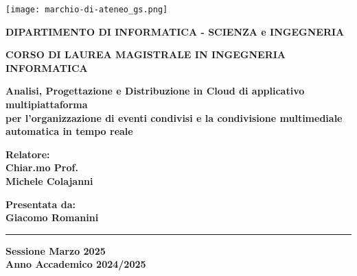 
\begin{titlepage}
    
\pagestyle{empty}


\begin{center}

\texttt{[image: marchio-di-ateneo\_gs.png]}

\vspace{10mm}

{\normalsize{\bf{DIPARTIMENTO DI INFORMATICA - SCIENZA e INGEGNERIA}}} 

\vspace{5mm}

{\large{\bf{CORSO DI LAUREA MAGISTRALE IN INGEGNERIA INFORMATICA}}}
\end{center}
\vspace{23mm}
\begin{adjustwidth}{15mm}{15mm}
\begin{center}

{\LARGE{\bf Analisi, Progettazione e Distribuzione in Cloud di applicativo multipiattaforma}}\\

{\LARGE{\bf per l'organizzazione di eventi condivisi e la condivisione multimediale automatica in tempo reale}}\\
\vspace{3mm}
\vspace{3mm}

\end{center}
\end{adjustwidth}

\vspace{35mm}

\begin{minipage}[t]{0.40\textwidth}
{\Large{\bf Relatore: \\ Chiar.mo Prof.\\ Michele Colajanni}}

\vspace{3mm}

{\Large{\bf }}
\end{minipage}
\hfill
\begin{minipage}[t]{0.40\textwidth}\raggedleft
{\Large{\bf Presentata da: \\ Giacomo Romanini}}
\end{minipage}

\vspace{10mm}

\rule[0.5cm]{15.8cm}{0.6mm}

\begin{center}
{\large{\bf Sessione Marzo 2025 \\}}
{\large{\bf Anno Accademico 2024/2025\\}}
\end{center}

\end{titlepage}

\restoregeometry
